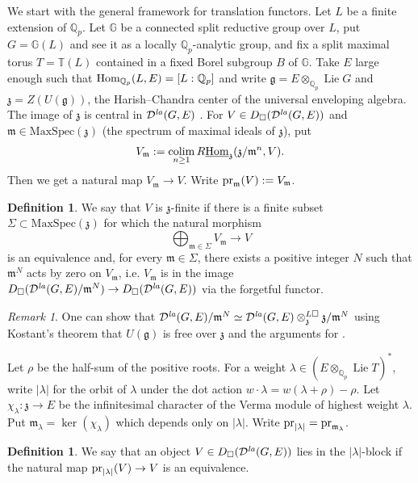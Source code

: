 \documentclass[a4paper,10pt]{amsart}
\theoremstyle{remark}
\newtheorem{remark}[theorem]{Remark}
\theoremstyle{definition}
\newtheorem{definition}[theorem]{Definition}
\theoremstyle{plain}
\numberwithin{equation}{section}
\newcommand{\bbQ}{{\mathbb Q}}
\newcommand{\bbT}{{\mathbb T}}
\newcommand{\frg}{{\mathfrak g}}
\renewcommand{\frm}{{\mathfrak m}}
\newcommand{\frz}{{\mathfrak z}}
\newcommand{\calD}{{\mathcal D}}
\newcommand{\Hom}{{\rm Hom}}
\newcommand{\uHom}{\underline{\Hom}}
\newcommand{\la}{{\it la}}
\newcommand{\pr}{{\rm pr}}
\DeclareMathOperator{\Lie}{{Lie}}
\DeclareMathOperator{\colim}{colim}
\begin{document}
We start with the general framework for translation functors. Let $L$ be a finite extension of $\bbQ_p$. Let $\mathbb G$ be a connected split reductive group over $L$, put $G=\mathbb G(L)$ and see it as a locally $\bbQ_p$-analytic group, and fix a split maximal torus $T=\bbT(L)$ contained in a fixed Borel subgroup $B$ of $\mathbb G$. Take  $E$ large enough such that $\Hom_{\bbQ_p}(L,E)=[L:\bbQ_p]$ and write $\mathfrak g=E\otimes_{\bbQ_p}\Lie G$ and $\frz=Z(U(\mathfrak g))$, the Harish--Chandra center of the universal enveloping algebra. The image of $\frz$ is central in $\calD^{\la}(G,E)$ \cite[Prop.~3.7]{ST02}.  For $V\in D_{\square}(\calD^{\la}(G,E))$ and $\mathfrak{m}\in\mathrm{MaxSpec}(\frz)$ (the spectrum of maximal ideals of $\frz$), put
\[
 V_{\mathfrak{m}}:=\colim_{n\geq1}
 R\uHom_{\frz}(\frz/\mathfrak{m}^n,V).
\]
Then we get a natural map $V_{\mathfrak{m}}\to V$. Write $\pr_{\mathfrak{m}}(V):=V_{\mathfrak{m}}$.

\begin{definition}\label{def:infinitesimal-character-finiteness}
We say that $V$ is $\frz$-finite if there is a finite subset $\Sigma\subset\mathrm{MaxSpec}(\frz)$ for which the natural morphism
\[
 \bigoplus_{\mathfrak{m}\in\Sigma} V_{\mathfrak{m}}\longrightarrow V
\]
is an equivalence and, for every $\mathfrak m\in\Sigma$, there exists a positive integer $N$ such that
$\mathfrak m^{N}$ acts by zero on $V_{\mathfrak m}$, i.e. $V_{\frm}$ is in the image $D_{\square}(\calD^{\la}(G,E)/\frm^{N})\to D_{\square}(\calD^{\la}(G,E))$ via the forgetful functor.
\end{definition}
\begin{remark}
	One can show that $\calD^{\la}(G,E)/\frm^N\simeq \calD^{\la}(G,E)\otimes^{L\square}_{\frz}\frz/\frm^N$ using Kostant's theorem that $U(\frg)$ is free over $\frz$ and the arguments for \cite[Prop.~4.8]{SchmidtStrauch2016dimensions}.
\end{remark}
Let $\rho$ be the half-sum of the positive roots. For a weight $\lambda\in(E\otimes_{\bbQ_p}\Lie T)^*$, write $|\lambda|$ for the orbit of $\lambda$ under the dot action $w\mathbin{\cdot}\lambda=w(\lambda+\rho)-\rho$. Let $\chi_\lambda:\frz\to E$ be the infinitesimal character of the Verma module of highest weight $\lambda$.  Put $\mathfrak{m}_\lambda=\ker(\chi_\lambda)$ which depends only on $|\lambda|$. Write $\pr_{|\lambda|}=\pr_{\mathfrak{m}_\lambda}$.

\begin{definition}\label{def:infinitesimal-character-block}
We say that an object $V\in D_{\square}(\calD^{\la}(G,E))$ lies in the $|\lambda|$-block if the natural map $\pr_{|\lambda|}(V)\to V$ is an equivalence.
\end{definition}
\end{document}
